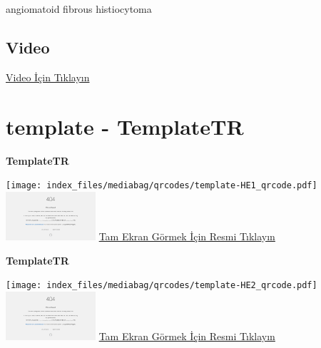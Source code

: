 \documentclass[
  letterpaper,
  DIV=11,
  numbers=noendperiod]{scrreprt}
\begin{document}
\begin{tcolorbox}[enhanced jigsaw, breakable, opacitybacktitle=0.6, arc=.35mm, colbacktitle=quarto-callout-tip-color!10!white, colback=white, toptitle=1mm, left=2mm, opacityback=0, colframe=quarto-callout-tip-color-frame, titlerule=0mm, rightrule=.15mm, bottomrule=.15mm, toprule=.15mm, bottomtitle=1mm, title=\textcolor{quarto-callout-tip-color}{\faLightbulb}\hspace{0.5em}{Tanı}, coltitle=black, leftrule=.75mm]

angiomatoid fibrous histiocytoma

\end{tcolorbox}

\hypertarget{video-8}{%
\subsection{Video}\label{video-8}}

\href{https://www.youtube.com/watch?v=9OxpsDNCHWk}{Video İçin Tıklayın}

\hypertarget{sec-template}{%
\section{template - TemplateTR}\label{sec-template}}

\textbf{TemplateTR}

\texttt{[image: index\_files/mediabag/qrcodes/template-HE1\_qrcode.pdf]}
\href{https://images.patolojiatlasi.com/template/HE1.html}{\includegraphics[width=0.25\textwidth,height=\textheight]{./screenshots/thumbnail_template-HE1.png}}
\href{https://images.patolojiatlasi.com/template/HE1.html}{Tam Ekran
Görmek İçin Resmi Tıklayın}

\textbf{TemplateTR}

\texttt{[image: index\_files/mediabag/qrcodes/template-HE2\_qrcode.pdf]}
\href{https://images.patolojiatlasi.com/template/HE2.html}{\includegraphics[width=0.25\textwidth,height=\textheight]{./screenshots/thumbnail_template-HE2.png}}
\href{https://images.patolojiatlasi.com/template/HE2.html}{Tam Ekran
Görmek İçin Resmi Tıklayın}
\end{document}
